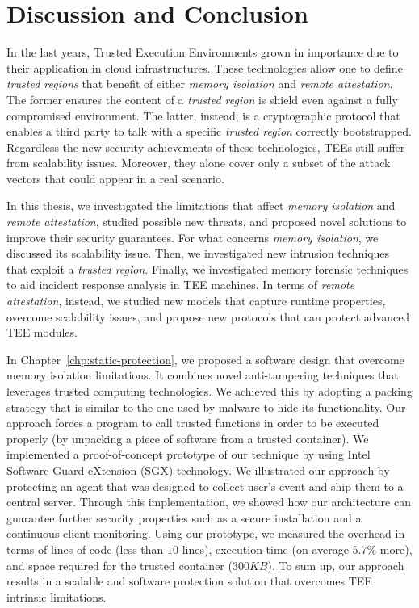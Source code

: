 \chapter{Discussion and Conclusion}
\label{chp:conclusion}

In the last years, Trusted Execution Environments grown in importance due to 
their application in cloud infrastructures.
These technologies allow one to define \emph{trusted regions} that benefit of 
either \emph{memory isolation} and \emph{remote attestation}.
The former ensures the content of a \emph{trusted region} is shield even 
against a fully compromised environment.
The latter, instead, is a cryptographic protocol that enables a third party to 
talk with a specific \emph{trusted region} correctly bootstrapped.
Regardless the new security achievements of these technologies, TEEs still 
suffer from scalability issues. 
Moreover, they alone cover only a subset of the attack vectors that could 
appear in a real scenario.
		
In this thesis, we investigated the limitations that affect \emph{memory 
isolation} and \emph{remote attestation}, studied possible new threats, and 
proposed novel solutions to improve their security guarantees.
For what concerns \emph{memory isolation}, we discussed its 
scalability issue. Then, we investigated new intrusion techniques that exploit 
a \emph{trusted region}.
Finally, we investigated memory forensic techniques to aid incident response 
analysis in TEE machines.
In terms of \emph{remote attestation}, instead, we studied new models that 
capture runtime properties, overcome scalability issues, and propose new 
protocols that can protect advanced TEE modules.


In Chapter~\ref{chp:static-protection}, we proposed a software design that 
overcome memory isolation limitations. It combines novel anti-tampering 
techniques that leverages trusted computing technologies.
We achieved this by adopting a packing strategy that is similar to the one used 
by malware to hide its functionality.
Our approach forces a program to call trusted functions in order to be executed 
properly (by unpacking a piece of software from a trusted container). 
We implemented a proof-of-concept prototype of our technique by using Intel 
Software Guard eXtension (SGX) technology.
We illustrated our approach by protecting an agent that was designed to collect 
user's event and ship them to a central server.
Through this implementation, we showed how our architecture can guarantee 
further security properties such as a secure installation and a continuous 
client monitoring. Using our prototype, we measured the overhead in terms of 
lines of code (less than $10$ lines), execution time (on average $5.7\%$ more), 
and space required for the trusted container ($300KB$).
To sum up, our approach results in a scalable and software protection solution 
that overcomes TEE intrinsic limitations.

